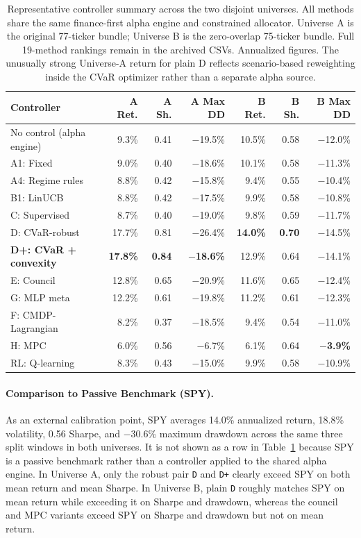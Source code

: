 \documentclass[10pt,twocolumn]{article}
\begin{document}
\begin{table}[t]
\centering
\small
\caption{Representative controller summary across the two disjoint universes.
All methods share the same finance-first alpha engine and constrained allocator.
Universe A is the original 77-ticker bundle; Universe B is the zero-overlap
75-ticker bundle. Full 19-method rankings remain in the archived CSVs.
Annualized figures. The unusually strong Universe-A return for plain D reflects
scenario-based reweighting inside the CVaR optimizer rather than a separate
alpha source.}
\label{tab:metrics}
\begin{tabular}{@{} l r r r r r r @{}}
\toprule
\textbf{Controller} & \textbf{A Ret.} & \textbf{A Sh.} & \textbf{A Max DD} & \textbf{B Ret.} & \textbf{B Sh.} & \textbf{B Max DD} \\
\midrule
No control (alpha engine) & 9.3\% & 0.41 & $-$19.5\% & 10.5\% & 0.58 & $-$12.0\% \\
\midrule
A1: Fixed & 9.0\% & 0.40 & $-$18.6\% & 10.1\% & 0.58 & $-$11.3\% \\
A4: Regime rules & 8.8\% & 0.42 & $-$15.8\% & 9.4\% & 0.55 & $-$10.4\% \\
\midrule
B1: LinUCB & 8.8\% & 0.42 & $-$17.5\% & 9.9\% & 0.58 & $-$10.8\% \\
\midrule
C: Supervised & 8.7\% & 0.40 & $-$19.0\% & 9.8\% & 0.59 & $-$11.7\% \\
\midrule
D: CVaR-robust & 17.7\% & 0.81 & $-$26.4\% & \textbf{14.0\%} & \textbf{0.70} & $-$14.5\% \\
\textbf{D+: CVaR + convexity} & \textbf{17.8\%} & \textbf{0.84} & \textbf{$-$18.6\%} & 12.9\% & 0.64 & $-$14.1\% \\
\midrule
E: Council & 12.8\% & 0.65 & $-$20.9\% & 11.6\% & 0.65 & $-$12.4\% \\
G: MLP meta & 12.2\% & 0.61 & $-$19.8\% & 11.2\% & 0.61 & $-$12.3\% \\
\midrule
F: CMDP-Lagrangian & 8.2\% & 0.37 & $-$18.5\% & 9.4\% & 0.54 & $-$11.0\% \\
H: MPC & 6.0\% & 0.56 & $-$6.7\% & 6.1\% & 0.64 & \textbf{$-$3.9\%} \\
RL: Q-learning & 8.3\% & 0.43 & $-$15.0\% & 9.9\% & 0.58 & $-$10.9\% \\
\bottomrule
\end{tabular}
\end{table}

\paragraph{Comparison to Passive Benchmark (SPY).}
As an external calibration point, SPY averages 14.0\% annualized return,
18.8\% volatility, 0.56 Sharpe, and $-$30.6\% maximum drawdown across the same
three split windows in both universes. It is not shown as a row in
Table~\ref{tab:metrics} because SPY is a passive benchmark rather than a
controller applied to the shared alpha engine. In Universe A, only the robust
pair \texttt{D} and \texttt{D+} clearly exceed SPY on both mean return and mean
Sharpe. In Universe B, plain \texttt{D} roughly matches SPY on mean return
while exceeding it on Sharpe and drawdown, whereas the council and MPC variants
exceed SPY on Sharpe and drawdown but not on mean return.
\end{document}

